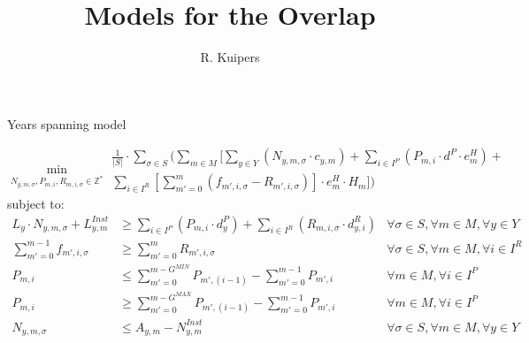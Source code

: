 \documentclass{beamer}
\title[Models for the Overlap]{Models for the Overlap}
\author{R. Kuipers}
\begin{document}

\begin{frame}{Years spanning model}
\scriptsize

\begin{equation}
	\min_{N_{y,m,\sigma}, P_{m,i}, R_{m,i,\sigma} \in \mathbb{Z}^*}
	\begin{aligned}
	\frac{1}{|S|} \cdot \sum_{\sigma \in S} ( \sum_{m \in M} [\sum_{y \in Y} 
	(N_{y,m,\sigma} \cdot c_{y,m}) +  
	\sum_{i \in I^P} (P_{m,i} \cdot d^P \cdot e^H_m) + \\
	\sum_{i \in I^R}[\sum_{m' = 0}^{m} (f_{m',i,\sigma} - R_{m',i,\sigma})] \cdot e^H_m \cdot H_m ])
	\end{aligned}	
\end{equation}
subject to:
\begin{align}
L_y \cdot N_{y,m,\sigma} + L^{Inst}_{y,m}	&\geq 	\sum_{i \in I^P} (P_{m,i} \cdot d^P_y) + \sum_{i \in I^R} (R_{m,i,\sigma} \cdot d^R_{y,i})  	
																				& \forall \sigma \in S, \forall m \in M, \forall y \in Y 	\\
\sum_{m' = 0}^{m-1} f_{m',i,\sigma}	&\geq 	\sum_{m' = 0}^m R_{m',i,\sigma}							& \forall \sigma \in S, \forall m \in M, \forall i \in I^R	\\
P_{m,i} 					&\leq 		\sum_{m' = 0}^{m-G^{MIN}} P_{m',(i-1)} - \sum_{m' = 0}^{m-1} P_{m',i}	& \forall m \in M, \forall i \in I^P 				\\
P_{m,i} 					&\geq	 	\sum_{m' = 0}^{m-G^{MAX}} P_{m',(i-1)} - \sum_{m' = 0}^{m-1} P_{m',i}	& \forall m \in M, \forall i \in I^P 				\\
N_{y,m,\sigma}				&\leq		A_{y,m} - N^{Inst}_{y,m}								& \forall \sigma \in S, \forall m \in M, \forall y \in Y
\end{align}

\end{frame}
\end{document}
